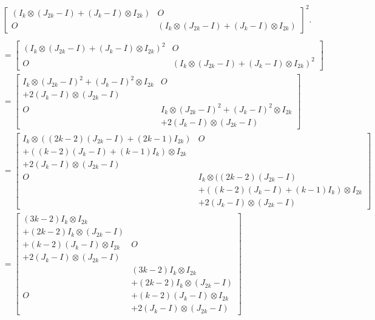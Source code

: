 \begin{align*}
    &\begin{bmatrix}
        (I_k\otimes(J_{2k}-I) + (J_k-I)\otimes I_{2k}) & O\\
        O & (I_k\otimes(J_{2k}-I) + (J_k-I)\otimes I_{2k})
    \end{bmatrix}^2.\\\\
    &=\begin{bmatrix}
        (I_k\otimes(J_{2k}-I) + (J_k-I)\otimes I_{2k})^2 & O\\
        O & (I_k\otimes(J_{2k}-I) + (J_k-I)\otimes I_{2k})^2
    \end{bmatrix} \\
    &=\begin{bmatrix}
        I_k\otimes (J_{2k}-I)^2+ (J_k-I)^2\otimes I_{2k} & O\\
        + 2(J_k-I)\otimes(J_{2k}-I) & \\
        O & I_k\otimes (J_{2k}-I)^2+ (J_k-I)^2\otimes I_{2k}\\
        &  + 2(J_k-I)\otimes(J_{2k}-I) 
    \end{bmatrix}\\
    &=\begin{bmatrix}
        I_k\otimes ((2k-2)(J_{2k}-I) + (2k-1)I_{2k}) & O\\
        + ((k-2)(J_k-I) + (k-1)I_k)\otimes I_{2k}& \\
        + 2(J_k-I)\otimes(J_{2k}-I) & \\
        O & I_k\otimes ((2k-2)(J_{2k}-I)\\
        & + ((k-2)(J_k-I) + (k-1)I_k)\otimes I_{2k}\\
        &  + 2(J_k-I)\otimes(J_{2k}-I) 
    \end{bmatrix}\\
    &=\begin{bmatrix}
        (3k-2)I_k\otimes I_{2k} & \\
        + (2k-2)I_k\otimes (J_{2k}-I)& \\
        + (k-2)(J_k-I)\otimes I_{2k} & O\\
        + 2(J_k-I)\otimes(J_{2k}-I)&\\
        & (3k-2)I_k\otimes I_{2k}\\
        & + (2k-2)I_k\otimes (J_{2k}-I)\\
        O&  + (k-2)(J_k-I)\otimes I_{2k} \\
        & + 2(J_k-I)\otimes(J_{2k}-I)
    \end{bmatrix}\\

\end{align*}
